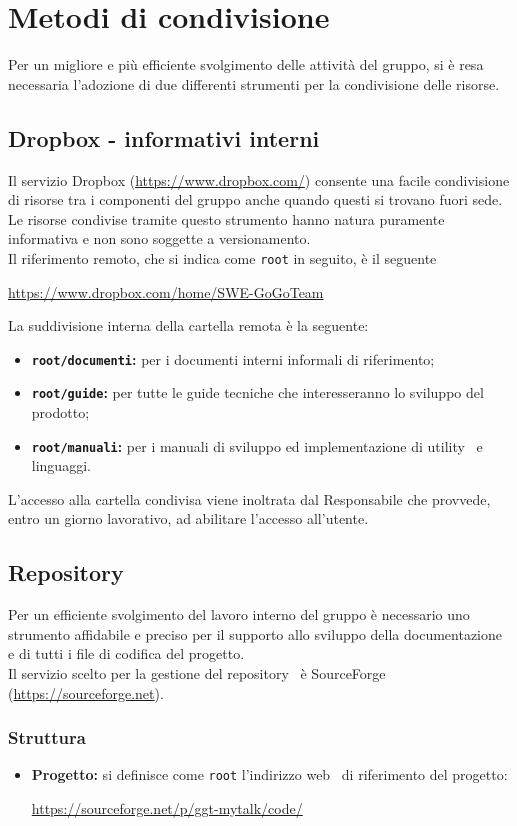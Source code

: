 \section{Metodi di condivisione} {
	Per un migliore e più efficiente svolgimento delle attività del gruppo, si è resa necessaria l'adozione di due differenti strumenti per la condivisione delle risorse.

	\subsection{Dropbox - informativi interni} {
		Il servizio Dropbox (\url{https://www.dropbox.com/}) consente una facile condivisione di risorse tra i componenti del gruppo anche quando questi si trovano fuori sede.\\
		Le risorse condivise tramite questo strumento hanno natura puramente informativa e non sono soggette a versionamento.\\
		Il riferimento remoto, che si indica come \texttt{root} in seguito, è il seguente
		\begin{center}
			\url{https://www.dropbox.com/home/SWE-GoGoTeam}
		\end{center}
		La suddivisione interna della cartella remota è la seguente:
		\begin{itemize}
			\item \textbf{\texttt{root/documenti}:} per i documenti interni informali di riferimento;
			\item \textbf{\texttt{root/guide}:} per tutte le guide tecniche che interesseranno lo sviluppo del prodotto;
			\item \textbf{\texttt{root/manuali}:} per i manuali di sviluppo ed implementazione di utility\g~ e linguaggi.
		\end{itemize}
		L'accesso alla cartella condivisa viene inoltrata dal Responsabile che provvede, entro un giorno lavorativo, ad abilitare l'accesso all'utente.
	}

	\subsection{Repository} {
		Per un efficiente svolgimento del lavoro interno del gruppo \`e necessario uno strumento affidabile e preciso per il supporto allo sviluppo della documentazione e di tutti i file di codifica del progetto.\\
		Il servizio scelto per la gestione del repository\g~ è SourceForge (\url{https://sourceforge.net}).
		\subsubsection{Struttura} {
			\begin{itemize}
				\item \textbf{Progetto:} si definisce come \texttt{root} l'indirizzo web\g~ di riferimento del progetto: 
				\begin{center}
					\url{https://sourceforge.net/p/ggt-mytalk/code/}
				\end{center}	
				

\end{itemize}}}}
